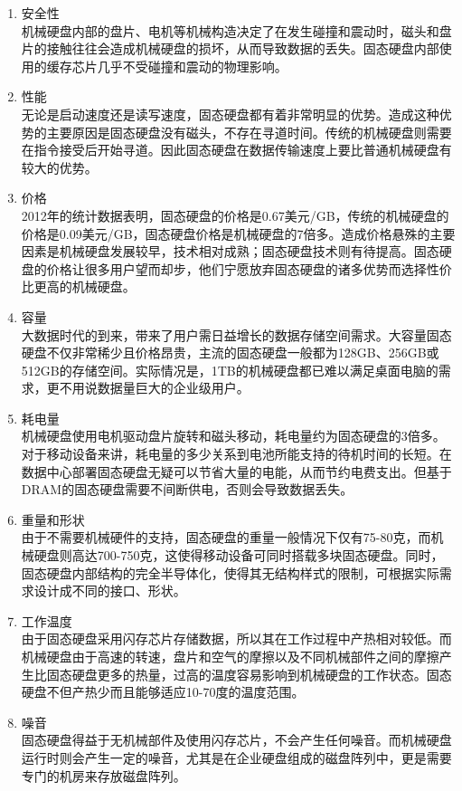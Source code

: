\begin{enumerate}
\item 安全性
\\机械硬盘内部的盘片、电机等机械构造决定了在发生碰撞和震动时，磁头和盘片的接触往往会造成机械硬盘的损坏，从而导致数据的丢失。固态硬盘内部使用的缓存芯片几乎不受碰撞和震动的物理影响。
\item 性能
\\无论是启动速度还是读写速度，固态硬盘都有着非常明显的优势。造成这种优势的主要原因是固态硬盘没有磁头，不存在寻道时间。传统的机械硬盘则需要在指令接受后开始寻道。因此固态硬盘在数据传输速度上要比普通机械硬盘有较大的优势。
\item 价格
\\2012年的统计数据表明，固态硬盘的价格是0.67美元/GB，传统的机械硬盘的价格是0.09美元/GB，固态硬盘价格是机械硬盘的7倍多。造成价格悬殊的主要因素是机械硬盘发展较早，技术相对成熟；固态硬盘技术则有待提高。固态硬盘的价格让很多用户望而却步，他们宁愿放弃固态硬盘的诸多优势而选择性价比更高的机械硬盘。
\item 容量
\\大数据时代的到来，带来了用户需日益增长的数据存储空间需求。大容量固态硬盘不仅非常稀少且价格昂贵，主流的固态硬盘一般都为128GB、256GB或512GB的存储空间。实际情况是，1TB的机械硬盘都已难以满足桌面电脑的需求，更不用说数据量巨大的企业级用户。
\item 耗电量
\\机械硬盘使用电机驱动盘片旋转和磁头移动，耗电量约为固态硬盘的3倍多。对于移动设备来讲，耗电量的多少关系到电池所能支持的待机时间的长短。在数据中心部署固态硬盘无疑可以节省大量的电能，从而节约电费支出。但基于DRAM的固态硬盘需要不间断供电，否则会导致数据丢失。
\item 重量和形状
\\由于不需要机械硬件的支持，固态硬盘的重量一般情况下仅有75-80克，而机械硬盘则高达700-750克，这使得移动设备可同时搭载多块固态硬盘。同时，固态硬盘内部结构的完全半导体化，使得其无结构样式的限制，可根据实际需求设计成不同的接口、形状。
\item 工作温度
\\由于固态硬盘采用闪存芯片存储数据，所以其在工作过程中产热相对较低。而机械硬盘由于高速的转速，盘片和空气的摩擦以及不同机械部件之间的摩擦产生比固态硬盘更多的热量，过高的温度容易影响到机械硬盘的工作状态。固态硬盘不但产热少而且能够适应10-70度的温度范围。
\item 噪音
\\ 固态硬盘得益于无机械部件及使用闪存芯片，不会产生任何噪音。而机械硬盘运行时则会产生一定的噪音，尤其是在企业硬盘组成的磁盘阵列中，更是需要专门的机房来存放磁盘阵列。
\end{enumerate}

